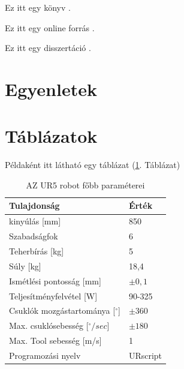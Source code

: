\documentclass[12pt,a4paper]{article}
\begin{document}
	Ez itt egy könyv \cite{book-example}.
	
	Ez itt egy online forrás \cite{online-example}.
	
	Ez itt egy disszertáció \cite{thesis-example}.
	
	\section{Egyenletek}
	
	\section{Táblázatok}
	Példaként itt látható egy táblázat (\ref{tab:ur5}. Táblázat)
	
	\begin{table}[]
		\centering
		\caption{AZ UR5 robot főbb paraméterei}
		\label{tab:ur5}
		\begin{tabular}{l|l}
			Tulajdonság                      & Érték    \\ \hline
			kinyúlás {[}mm{]}                & 850      \\ \hline
			Szabadságfok                     & 6        \\ \hline
			Teherbírás {[}kg{]}               & 5        \\ \hline
			Súly {[}kg{]}                    & 18,4     \\ \hline
			Ismétlési pontosság {[}mm{]}     & $\pm0,1$    \\ \hline
			Teljesítményfelvétel {[}W{]}     & 90-325   \\ \hline
			Csuklók mozgástartománya {[}$^{\circ}${]} & $\pm360$    \\ \hline
			Max. csuklósebesség {[}$^{\circ}/sec${]}  & $\pm180$    \\ \hline
			Max. Tool sebesség {[}m/s{]}     & 1        \\ \hline
			Programozási nyelv               & URscript \\ \hline
		\end{tabular}
	\end{table}
\end{document}

